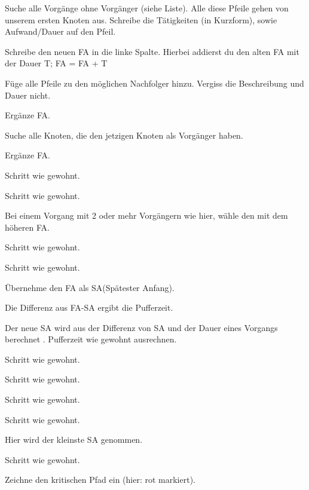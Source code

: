 \documentclass{beamer}
\begin{document}
\begin{frame}[t,shrink=65]
\begin{columns}
\begin{itemize}
{    \item<only@+> {Suche alle Vorgänge ohne Vorgänger (siehe Liste). Alle diese Pfeile gehen von unserem ersten Knoten aus. Schreibe die Tätigkeiten (in Kurzform), sowie Aufwand/Dauer auf den Pfeil.}
    \item<only@+> {Schreibe den neuen FA in die linke Spalte. Hierbei addierst du den alten FA mit der Dauer T;
                   FA = FA + T}
    \item<only@+> {Füge alle Pfeile zu den möglichen Nachfolger hinzu. Vergiss die Beschreibung und Dauer nicht.}
    \item<only@+> {Ergänze FA.}
    \item<only@+> {Suche alle Knoten, die den jetzigen Knoten als Vorgänger haben.}
    \item<only@+> {Ergänze FA.}
    \item<only@+> {Schritt wie gewohnt.}
    \item<only@+> {Schritt wie gewohnt.}
    \item<only@+> {Bei einem Vorgang mit 2 oder mehr Vorgängern wie hier, wähle den mit dem höheren FA.}
    \item<only@+> {Schritt wie gewohnt.}
    \item<only@+> {Schritt wie gewohnt.}
    \item<only@+> {Übernehme den FA als SA(Spätester Anfang).}
    \item<only@+> {Die Differenz aus FA-SA ergibt die Pufferzeit.}
    \item<only@+> {Der neue SA wird aus der Differenz von SA und der Dauer eines Vorgangs berechnet . Pufferzeit wie gewohnt ausrechnen.}
    \item<only@+> {Schritt wie gewohnt.}
    \item<only@+> {Schritt wie gewohnt.}
    \item<only@+> {Schritt wie gewohnt.}
    \item<only@+> {Schritt wie gewohnt.}
    \item<only@+> {Hier wird der kleinste SA genommen.}
    \item<only@+> {Schritt wie gewohnt.}
    \item<only@+> {Zeichne den kritischen Pfad ein (hier: rot markiert).}
    \item \alert<+> {}
}

\end{itemize}

\par\vspace{2cm}\noindent %


\end{columns}
\end{frame}
\end{document}
